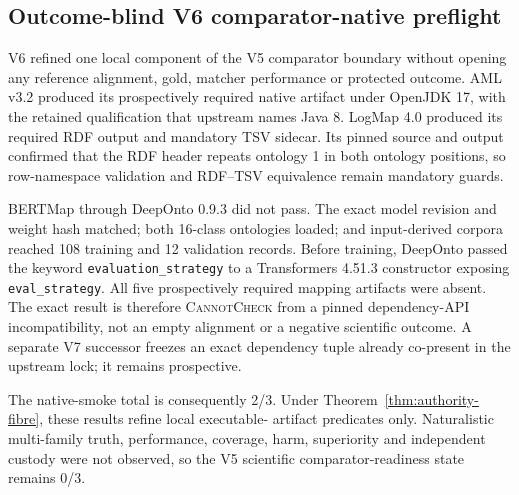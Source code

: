\subsection{Outcome-blind V6 comparator-native preflight}

V6 refined one local component of the V5 comparator boundary without opening
any reference alignment, gold, matcher performance or protected outcome. AML
v3.2 produced its prospectively required native artifact under OpenJDK 17,
with the retained qualification that upstream names Java 8. LogMap 4.0
produced its required RDF output and mandatory TSV sidecar. Its pinned source
and output confirmed that the RDF header repeats ontology 1 in both ontology
positions, so row-namespace validation and RDF--TSV equivalence remain
mandatory guards.

BERTMap through DeepOnto 0.9.3 did not pass. The exact model revision and
weight hash matched; both 16-class ontologies loaded; and input-derived
corpora reached 108 training and 12 validation records. Before training,
DeepOnto passed the keyword \texttt{evaluation\_strategy} to a Transformers
4.51.3 constructor exposing \texttt{eval\_strategy}. All five prospectively
required mapping artifacts were absent. The exact result is therefore
\textsc{CannotCheck} from a pinned dependency-API incompatibility, not an empty
alignment or a negative scientific outcome. A separate V7 successor freezes
an exact dependency tuple already co-present in the upstream lock; it remains
prospective.

The native-smoke total is consequently 2/3. Under
Theorem~\ref{thm:authority-fibre}, these results refine local executable-
artifact predicates only. Naturalistic multi-family truth, performance,
coverage, harm, superiority and independent custody were not observed, so the
V5 scientific comparator-readiness state remains 0/3.

